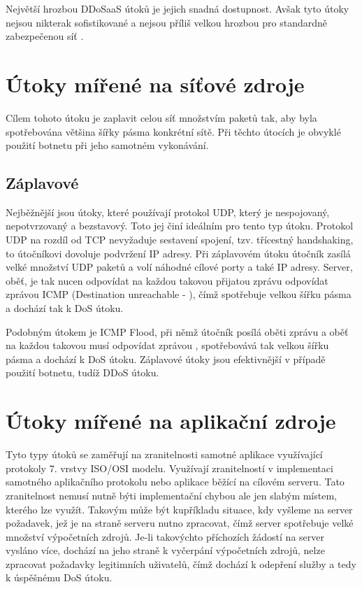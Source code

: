 Největší hrozbou DDoSaaS útoků je jejich snadná dostupnost. Avšak tyto útoky nejsou
nikterak sofistikované a nejsou příliš velkou hrozbou pro standardně zabezpečenou síť
\cite{DDoSaaS}.

\section{Útoky mířené na síťové zdroje}
\label{sec:utoky_na_sitove_zdroje}
Cílem tohoto útoku je zaplavit celou síť množstvím paketů tak, aby byla spotřebována většina
šířky pásma konkrétní sítě. Při těchto útocích je obvyklé použití botnetu při jeho samotném
vykonávání.

\subsection{Záplavové}
\label{subs_zaplavove}
Nejběžnější jsou útoky, které používají protokol UDP, který je nespojovaný, nepotvrzovaný a
bezstavový. Toto jej činí ideálním pro tento typ útoku. Protokol UDP na rozdíl od TCP
nevyžaduje sestavení spojení, tzv. třícestný handshaking, to útočníkovi dovoluje podvržení
IP adresy. Při záplavovém útoku útočník zasílá velké množství UDP paketů a volí náhodné
cílové porty a také IP adresy. Server, oběť, je tak nucen odpovídat na každou takovou
přijatou zprávu odpovídat zprávou ICMP (Destination unreachable - ),
čímž spotřebuje velkou šířku pásma a dochází tak k DoS útoku.


Podobným útokem je ICMP Flood, při němž útočník posílá oběti zprávu  a oběť
na každou takovou musí odpovídat zprávou , spotřebovává tak velkou šířku
pásma a dochází k DoS útoku.
Záplavové útoky jsou efektivnější v případě použití botnetu, tudíž DDoS útoku.


\section{Útoky mířené na aplikační zdroje}
\label{sec:utoky_na_aplikacni_zdroje}
Tyto typy útoků se zaměřují na zranitelnosti samotné aplikace využívající protokoly 
7. vrstvy ISO/OSI modelu. Využívají zranitelností v implementaci samotného aplikačního
protokolu nebo aplikace běžící na cílovém serveru. Tato zranitelnost nemusí nutně býti
implementační chybou ale jen slabým místem, kterého lze využít. Takovým může být kupříkladu
situace, kdy vyšleme na server požadavek, jež je na straně serveru nutno zpracovat, čímž
server spotřebuje velké množství výpočetních zdrojů. Je-li takovýchto příchozích žádostí na
server vysláno více, dochází na jeho straně k vyčerpání výpočetních zdrojů, nelze zpracovat
požadavky legitimních uživatelů, čímž dochází k odepření služby a tedy k úspěšnému DoS útoku.

